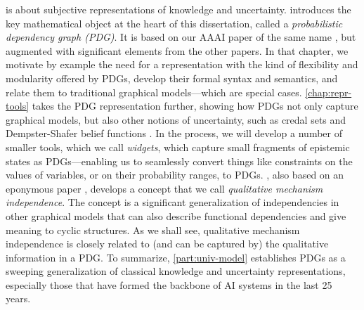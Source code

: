 is about subjective representations of knowledge and uncertainty. 
%
 introduces the key mathematical object at the heart of this dissertation, called a \emph{probabilistic dependency graph (PDG)}. 
It is based on our AAAI paper of the same name \citep{pdg-aaai}, but augmented with significant elements from the other papers. 
In that chapter, we motivate by example the need for a representation with the kind of flexibility and modularity offered by PDGs, develop their formal syntax and semantics, and relate them to traditional graphical models---which are special cases. 
%
\cref{chap:repr-tools} takes the PDG representation further, showing how PDGs not only capture graphical models, but also other notions of uncertainty, such as credal sets \citep{Walley1991-SRIP} and Dempster-Shafer belief functions \citep{shafer1976mathematical}.  
In the process, we will develop a number of smaller tools, which we call \emph{widgets}, which capture small fragments of epistemic states as PDGs---enabling us to seamlessly convert things like constraints on the values of variables, or on their probability ranges, to PDGs.
,
    also based on 
    an eponymous paper \citep*{qim},
    develops a concept that we call \emph{qualitative mechanism independence}.
The concept is a significant generalization of independencies in other graphical models that can also describe functional dependencies and give meaning to cyclic structures. 
As we shall see, qualitative mechanism independence is closely related to (and can be captured by) the qualitative information in a PDG.
%
To summarize, \cref{part:univ-model} establishes PDGs as a sweeping generalization of classical knowledge and uncertainty representations, especially those that have formed the backbone of AI systems in the last 25 years. 


